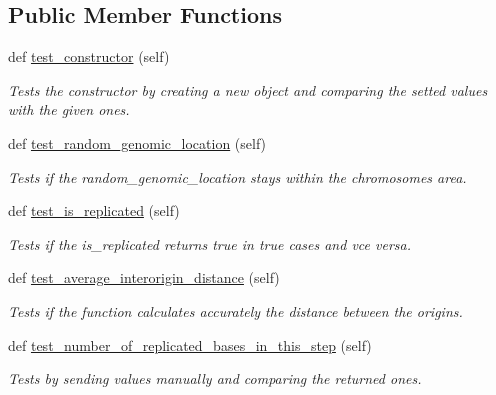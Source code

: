 \subsection*{Public Member Functions}
\begin{DoxyCompactItemize}
\item 
\mbox{\label{classReDyMo_1_1test_1_1test__genome_1_1TestGenome_ab20586dfa32d303107488319f9012d9a}} 
def \mbox{\hyperlink{classReDyMo_1_1test_1_1test__genome_1_1TestGenome_ab20586dfa32d303107488319f9012d9a}{test\+\_\+constructor}} (self)
\begin{DoxyCompactList}\small\item\em Tests the constructor by creating a new object and comparing the setted values with the given ones. \end{DoxyCompactList}\item 
def \mbox{\hyperlink{classReDyMo_1_1test_1_1test__genome_1_1TestGenome_a9d1148ac068b11c35cd1d67139b78bfd}{test\+\_\+random\+\_\+genomic\+\_\+location}} (self)
\begin{DoxyCompactList}\small\item\em Tests if the random\+\_\+genomic\+\_\+location stays within the chromosomes\textquotesingle{} area. \end{DoxyCompactList}\item 
def \mbox{\hyperlink{classReDyMo_1_1test_1_1test__genome_1_1TestGenome_aced56bad873a4503b097d17655b0233a}{test\+\_\+is\+\_\+replicated}} (self)
\begin{DoxyCompactList}\small\item\em Tests if the is\+\_\+replicated returns true in true cases and vce versa. \end{DoxyCompactList}\item 
\mbox{\label{classReDyMo_1_1test_1_1test__genome_1_1TestGenome_ac5570c5ae42eea415ec9086ae5e2c80e}} 
def \mbox{\hyperlink{classReDyMo_1_1test_1_1test__genome_1_1TestGenome_ac5570c5ae42eea415ec9086ae5e2c80e}{test\+\_\+average\+\_\+interorigin\+\_\+distance}} (self)
\begin{DoxyCompactList}\small\item\em Tests if the function calculates accurately the distance between the origins. \end{DoxyCompactList}\item 
def \mbox{\hyperlink{classReDyMo_1_1test_1_1test__genome_1_1TestGenome_a6a4e2180628fb76e2b44a98870e3df89}{test\+\_\+number\+\_\+of\+\_\+replicated\+\_\+bases\+\_\+in\+\_\+this\+\_\+step}} (self)
\begin{DoxyCompactList}\small\item\em Tests by sending values manually and comparing the returned ones. \end{DoxyCompactList}\end{DoxyCompactItemize}


